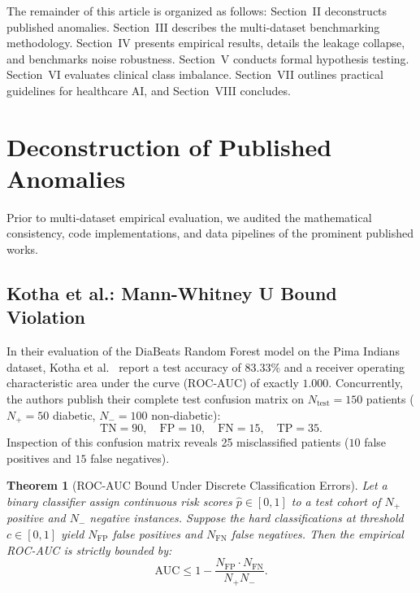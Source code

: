 \documentclass[journal,twocolumn]{IEEEtran}
\newtheorem{theorem}{Theorem}
\begin{document}
The remainder of this article is organized as follows: Section~II deconstructs published anomalies. Section~III describes the multi-dataset benchmarking methodology. Section~IV presents empirical results, details the leakage collapse, and benchmarks noise robustness. Section~V conducts formal hypothesis testing. Section~VI evaluates clinical class imbalance. Section~VII outlines practical guidelines for healthcare AI, and Section~VIII concludes.

\section{Deconstruction of Published Anomalies}
\label{sec:anomalies}

Prior to multi-dataset empirical evaluation, we audited the mathematical consistency, code implementations, and data pipelines of the prominent published works.

\subsection{Kotha et al.: Mann-Whitney U Bound Violation}
In their evaluation of the DiaBeats Random Forest model on the Pima Indians dataset, Kotha et al.~\cite{kotha2026} report a test accuracy of $83.33\%$ and a receiver operating characteristic area under the curve ($\text{ROC-AUC}$) of exactly $1.000$. Concurrently, the authors publish their complete test confusion matrix on $N_{\text{test}} = 150$ patients ($N_+ = 50$ diabetic, $N_- = 100$ non-diabetic):
\begin{equation}
\text{TN} = 90, \quad \text{FP} = 10, \quad \text{FN} = 15, \quad \text{TP} = 35.
\end{equation}
Inspection of this confusion matrix reveals 25 misclassified patients ($10$ false positives and $15$ false negatives).

\begin{theorem}[ROC-AUC Bound Under Discrete Classification Errors]
Let a binary classifier assign continuous risk scores $\hat{p} \in [0, 1]$ to a test cohort of $N_+$ positive and $N_-$ negative instances. Suppose the hard classifications at threshold $c \in [0, 1]$ yield $N_{\text{FP}}$ false positives and $N_{\text{FN}}$ false negatives. Then the empirical ROC-AUC is strictly bounded by:
\begin{equation}
\text{AUC} \le 1 - \frac{N_{\text{FP}} \cdot N_{\text{FN}}}{N_+ N_-}.
\end{equation}
\end{theorem}
\end{document}
